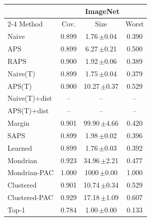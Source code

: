 \begin{tabular}{lccc}
\toprule
 & \multicolumn{3}{c}{ImageNet} \\
\cmidrule(lr){2-4}
Method & Cov. & Size & Worst \\
\midrule
Naive & 0.899 & 1.76\,{\scriptsize$\pm$0.04} & 0.390 \\
APS & 0.899 & 6.27\,{\scriptsize$\pm$0.21} & 0.500 \\
RAPS & 0.900 & 1.92\,{\scriptsize$\pm$0.06} & 0.389 \\
Naive(T) & 0.899 & 1.75\,{\scriptsize$\pm$0.04} & 0.379 \\
APS(T) & 0.900 & 10.27\,{\scriptsize$\pm$0.37} & 0.529 \\
Naive(T)+dist & -- & -- & -- \\
APS(T)+dist & -- & -- & -- \\
\addlinespace[2pt]
Margin & 0.901 & 99.90\,{\scriptsize$\pm$4.66} & 0.420 \\
SAPS & 0.899 & 1.98\,{\scriptsize$\pm$0.02} & 0.396 \\
Learned & 0.899 & 1.76\,{\scriptsize$\pm$0.03} & 0.392 \\
\addlinespace[2pt]
Mondrian & 0.923 & 34.96\,{\scriptsize$\pm$2.21} & 0.477 \\
Mondrian-PAC & 1.000 & 1000\,{\scriptsize$\pm$0.00} & 1.000 \\
Clustered & 0.901 & 10.74\,{\scriptsize$\pm$0.34} & 0.529 \\
Clustered-PAC & 0.929 & 17.18\,{\scriptsize$\pm$1.09} & 0.607 \\
Top-1 & 0.784 & 1.00\,{\scriptsize$\pm$0.00} & 0.133 \\
\bottomrule
\end{tabular}
